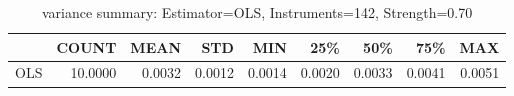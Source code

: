 \begin{table}[ht]
\centering
\caption{variance summary: Estimator=OLS, Instruments=142, Strength=0.70}
\begin{tabular}{lrrrrrrrr}
\toprule
 & COUNT & MEAN & STD & MIN & 25\% & 50\% & 75\% & MAX \\
\midrule
OLS & 10.0000 & 0.0032 & 0.0012 & 0.0014 & 0.0020 & 0.0033 & 0.0041 & 0.0051 \\
\bottomrule
\end{tabular}
\end{table}
